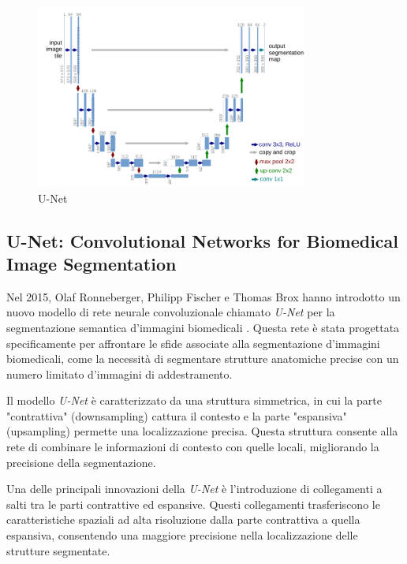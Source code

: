 \begin{figure}[h!]
  \begin{center}
    \includegraphics[width=0.8\textwidth]{Immagini/unet.png}
  \end{center}
  \caption{U-Net}\label{fig:unet}
\end{figure}


\subsection{U-Net: Convolutional Networks for Biomedical Image Segmentation}

Nel 2015, Olaf Ronneberger, Philipp Fischer e Thomas Brox hanno introdotto un
nuovo modello di rete neurale convoluzionale chiamato \textit{U-Net} per la
segmentazione semantica d'immagini biomedicali \cite{ronneberger2015unet}.
Questa rete è stata progettata specificamente per affrontare le sfide associate
alla segmentazione d'immagini biomedicali, come la necessità di segmentare
strutture anatomiche precise con un numero limitato d'immagini di
addestramento.

Il modello \textit{U-Net} è caratterizzato da una struttura simmetrica, in cui
la parte "contrattiva" (downsampling) cattura il contesto e la parte "espansiva"
(upsampling) permette una localizzazione precisa. Questa struttura consente alla
rete di combinare le informazioni di contesto con quelle locali, migliorando la
precisione della segmentazione.

Una delle principali innovazioni della \textit{U-Net} è l'introduzione di
collegamenti a salti tra le parti contrattive ed espansive. Questi collegamenti
trasferiscono le caratteristiche spaziali ad alta risoluzione dalla parte
contrattiva a quella espansiva, consentendo una maggiore precisione nella
localizzazione delle strutture segmentate.

